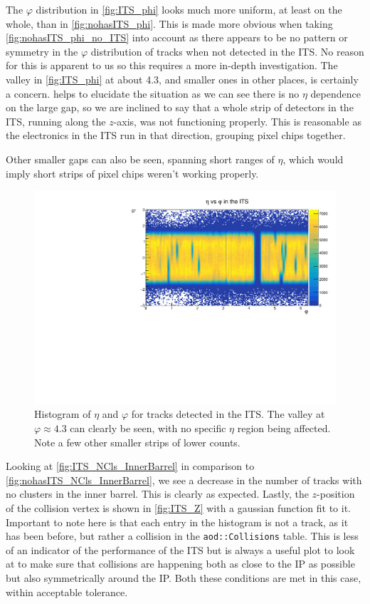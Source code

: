 The $\varphi$ distribution in \cref{fig:ITS_phi} looks much more uniform, at least on the whole, than in \cref{fig:nohasITS_phi}. This is made more obvious when taking \cref{fig:nohasITS_phi_no_ITS} into account as there appears to be no pattern or symmetry in the $\varphi$ distribution of tracks when not detected in the ITS. No reason for this is apparent to us so this requires a more in-depth investigation. The valley in \cref{fig:ITS_phi} at about 4.3, and smaller ones in other places, is certainly a concern.  helps to elucidate the situation as we can see there is no $\eta$ dependence on the large gap, so we are inclined to say that a whole strip of detectors in the ITS, running along the $z$-axis, was not functioning properly. This is reasonable as the electronics in the ITS run in that direction, grouping pixel chips together. 

Other smaller gaps can also be seen, spanning short ranges of $\eta$, which would imply short strips of pixel chips weren't working properly.

\begin{figure}[h]
    \begin{center}
        \includegraphics[width=.8\textwidth]{Plots/pass4_TracksIU/eta_phi.pdf}
        \caption[$\eta$-$\varphi$ histogram for tracks in the ITS]{Histogram of $\eta$ and $\varphi$ for tracks detected in the ITS. The valley at $\varphi\approx 4.3$ can clearly be seen, with no specific $\eta$ region being affected. Note a few other smaller strips of lower counts.}
        \label{fig:ITS_eta_phi}
    \end{center}
\end{figure}

Looking at \cref{fig:ITS_NCls_InnerBarrel} in comparison to \cref{fig:nohasITS_NCls_InnerBarrel}, we see a decrease in the number of tracks with no clusters in the inner barrel. This is clearly as expected. Lastly, the $z$-position of the collision vertex is shown in \cref{fig:ITS_Z} with a gaussian function fit to it. Important to note here is that each entry in the histogram is not a track, as it has been before, but rather a collision in the \texttt{aod::Collisions} table. This is less of an indicator of the performance of the ITS but is always a useful plot to look at to make sure that collisions are happening both as close to the IP as possible but also symmetrically around the IP. Both these conditions are met in this case, within acceptable tolerance. 

